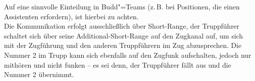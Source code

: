 Auf eine sinnvolle Einteilung in Budd"=Teams (z.\,B. bei Positionen, die einen Assistenten erfordern), ist hierbei zu achten.\\
Die Kommunikation erfolgt ausschließlich über Short-Range, der Truppführer schaltet sich über seine Additional-Short-Range auf den Zugkanal auf, um sich mit der Zugführung und den anderen Truppführern im Zug abzusprechen. Die Nummer 2 im Trupp kann sich ebenfalls auf den Zugfunk aufschalten, jedoch nur mithören und nicht funken -- es sei denn, der Truppführer fällt aus und die Nummer 2 übernimmt.